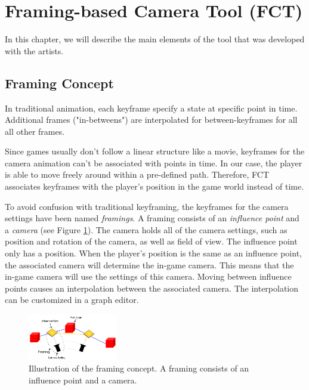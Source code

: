 \section{Framing-based Camera Tool (FCT)}
In this chapter, we will describe the main elements of the tool that was developed with the artists.

\subsection{Framing Concept}
In traditional animation, each keyframe specify a state at specific point in time. Additional frames ("in-betweens") are interpolated for between-keyframes for all all other frames.




Since games usually don't follow a linear structure like a movie, keyframes for the camera animation can't be associated with points in time. In our case, the player is able to move freely around within a pre-defined path. Therefore, FCT associates keyframes with the player's position in the game world instead of time.



To avoid confusion with traditional keyframing, the keyframes for the camera settings have been named \textit{framings}. A framing consists of an \textit{influence point} and a \textit{camera} (see Figure \ref{fig:framingConceptNew}). The camera holds all of the camera settings, such as position and rotation of the camera, as well as field of view. The influence point only has a position. When the player's position is the same as an influence point, the associated camera will determine the in-game camera. This means that the in-game camera will use the settings of this camera. Moving between influence points causes an interpolation between the associated camera. The interpolation can be customized in a graph editor.

\begin{figure}[htbp]
\centering
\includegraphics[width=0.35\textwidth]{Pics/Instructions}
\caption{Illustration of the framing concept. A framing consists of an influence point and a camera.}
\label{fig:framingConceptNew}
\end{figure}

